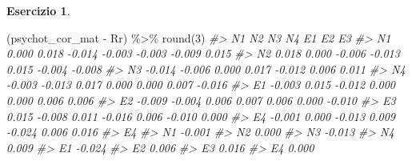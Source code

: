 \documentclass[
  11pt,
]{krantz}
\makeatletter
\newenvironment{Shaded}{\begin{snugshade}}{\end{snugshade}}
\newcommand{\CommentTok}[1]{\textcolor[rgb]{0.37,0.37,0.37}{\textit{#1}}}
\newcommand{\DecValTok}[1]{\textcolor[rgb]{0.06,0.06,0.06}{#1}}
\newcommand{\FunctionTok}[1]{\textcolor[rgb]{0,0,0}{#1}}
\newcommand{\NormalTok}[1]{#1}
\newcommand{\SpecialCharTok}[1]{\textcolor[rgb]{0,0,0}{#1}}
\newenvironment{kframe}{%
\medskip{}
\setlength{\fboxsep}{.8em}
 \def\at@end@of@kframe{}%
 \ifinner\ifhmode%
  \def\at@end@of@kframe{\end{minipage}}%
  \begin{minipage}{\columnwidth}%
 \fi\fi%
 \def\FrameCommand##1{\hskip\@totalleftmargin \hskip-\fboxsep
 \colorbox{shadecolor}{##1}\hskip-\fboxsep
     \hskip-\linewidth \hskip-\@totalleftmargin \hskip\columnwidth}%
 \MakeFramed {\advance\hsize-\width
   \@totalleftmargin\z@ \linewidth\hsize
   \@setminipage}}%
 {\par\unskip\endMakeFramed%
 \at@end@of@kframe}
\renewenvironment{Shaded}{\begin{kframe}}{\end{kframe}}
\theoremstyle{definition}
\theoremstyle{definition}
\theoremstyle{definition}
\newtheorem{exercise}{Esercizio}[chapter]
\theoremstyle{definition}
\theoremstyle{remark}
\makeatother
\begin{document}
\begin{exercise}
\begin{Shaded}
\begin{Highlighting}[]
\NormalTok{(psychot\_cor\_mat }\SpecialCharTok{{-}}\NormalTok{ Rr) }\SpecialCharTok{\%\textgreater{}\%}
  \FunctionTok{round}\NormalTok{(}\DecValTok{3}\NormalTok{)}
\CommentTok{\#\textgreater{}        N1     N2     N3     N4     E1     E2     E3}
\CommentTok{\#\textgreater{} N1  0.000  0.018 {-}0.014 {-}0.003 {-}0.003 {-}0.009  0.015}
\CommentTok{\#\textgreater{} N2  0.018  0.000 {-}0.006 {-}0.013  0.015 {-}0.004 {-}0.008}
\CommentTok{\#\textgreater{} N3 {-}0.014 {-}0.006  0.000  0.017 {-}0.012  0.006  0.011}
\CommentTok{\#\textgreater{} N4 {-}0.003 {-}0.013  0.017  0.000  0.000  0.007 {-}0.016}
\CommentTok{\#\textgreater{} E1 {-}0.003  0.015 {-}0.012  0.000  0.000  0.006  0.006}
\CommentTok{\#\textgreater{} E2 {-}0.009 {-}0.004  0.006  0.007  0.006  0.000 {-}0.010}
\CommentTok{\#\textgreater{} E3  0.015 {-}0.008  0.011 {-}0.016  0.006 {-}0.010  0.000}
\CommentTok{\#\textgreater{} E4 {-}0.001  0.000 {-}0.013  0.009 {-}0.024  0.006  0.016}
\CommentTok{\#\textgreater{}        E4}
\CommentTok{\#\textgreater{} N1 {-}0.001}
\CommentTok{\#\textgreater{} N2  0.000}
\CommentTok{\#\textgreater{} N3 {-}0.013}
\CommentTok{\#\textgreater{} N4  0.009}
\CommentTok{\#\textgreater{} E1 {-}0.024}
\CommentTok{\#\textgreater{} E2  0.006}
\CommentTok{\#\textgreater{} E3  0.016}
\CommentTok{\#\textgreater{} E4  0.000}
\end{Highlighting}
\end{Shaded}

\end{exercise}
\end{document}

